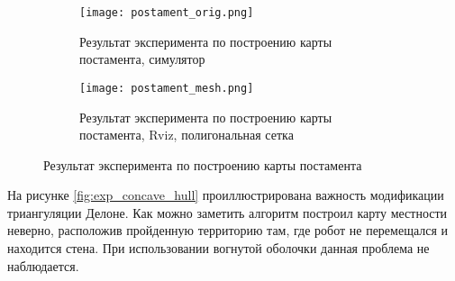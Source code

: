 \begin{figure}[H]
    \begin{subfigure}{0.99\textwidth}
        \centering\texttt{[image: postament\_orig.png]}
        \caption{Результат эксперимента по построению карты постамента, симулятор}
        \label{fig:postament_orig.png}
    \end{subfigure}

    \begin{subfigure}{0.99\textwidth}
        \centering\texttt{[image: postament\_mesh.png]}
        \caption{Результат эксперимента по построению карты постамента, Rviz, полигональная сетка}
        \label{fig:postament_mesh.png}
    \end{subfigure}

    \caption{Результат эксперимента по построению карты постамента}
    \label{fig:}
\end{figure}

На рисунке \ref{fig:exp_concave_hull} проиллюстрирована  важность модификации триангуляции Делоне. Как можно заметить  алгоритм построил карту местности неверно, расположив пройденную территорию там, где робот не перемещался и находится стена. При использовании вогнутой оболочки  данная проблема не наблюдается.

